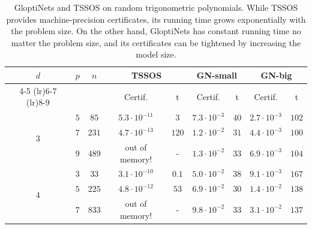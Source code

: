 \documentclass{article}
\begin{document}
\begin{table}
  \caption{GloptiNets and TSSOS on random trigonometric polynomials. While TSSOS provides machine-precision certificates, its running time grows exponentially with the problem size. On the other hand, GloptiNets has constant running time no matter the problem size, and its certificates can be tightened by increasing the model size.}
  \label{tab:xp-tsssos-fourier}
  \centering
  \begin{tabular}{*{9}{c}}
    \toprule
    \multirow{3}{*}{$d$}         &
    \multirow{3}{*}{$p$}         &
    \multirow{3}{*}{$n$}         &

    \multicolumn{2}{c}{TSSOS}    &
    \multicolumn{2}{c}{GN-small} & \multicolumn{2}{c}{GN-big}                                                                                                   \\
    \cmidrule(lr){4-5}
    \cmidrule(lr){6-7}
    \cmidrule(lr){8-9}


                                 &                            &       & Certif.              & t     &
    Certif.                      & t                          &
    Certif.                      & t
    \\
    \midrule
    \multirow{3}{*}{$3$}         & $5$                        & $85$  & $5.3 \cdot 10^{-11}$ & $3$   & $7.3 \cdot 10^{-3}$ & $40$ & $2.7 \cdot 10^{-3}$ & $102$ \\
                                 & $7$                        & $231$ & $4.7 \cdot 10^{-13}$ & $120$ & $1.2 \cdot 10^{-2}$ & $31$ & $4.4 \cdot 10^{-3}$ & $100$ \\
                                 & $9$                        & $489$ & out of memory!       & -     & $1.3 \cdot 10^{-2}$ & $33$ & $6.9 \cdot 10^{-3}$ & $104$ \\
    \midrule
    \multirow{3}{*}{$4$}         & $3$                        & $33$  & $3.1 \cdot 10^{-10}$ & $0.1$ & $5.0 \cdot 10^{-2}$ & $38$ & $9.1 \cdot 10^{-3}$ & $167$ \\
                                 & $5$                        & $225$ & $4.8 \cdot 10^{-12}$ & $53$  & $6.9 \cdot 10^{-2}$ & $30$ & $1.4 \cdot 10^{-2}$ & $138$ \\
                                 & $7$                        & $833$ & out of memory!       & -     & $9.8 \cdot 10^{-2}$ & $33$ & $3.1 \cdot 10^{-2}$ & $137$ \\
    \bottomrule
  \end{tabular}
\end{table}
\end{document}
